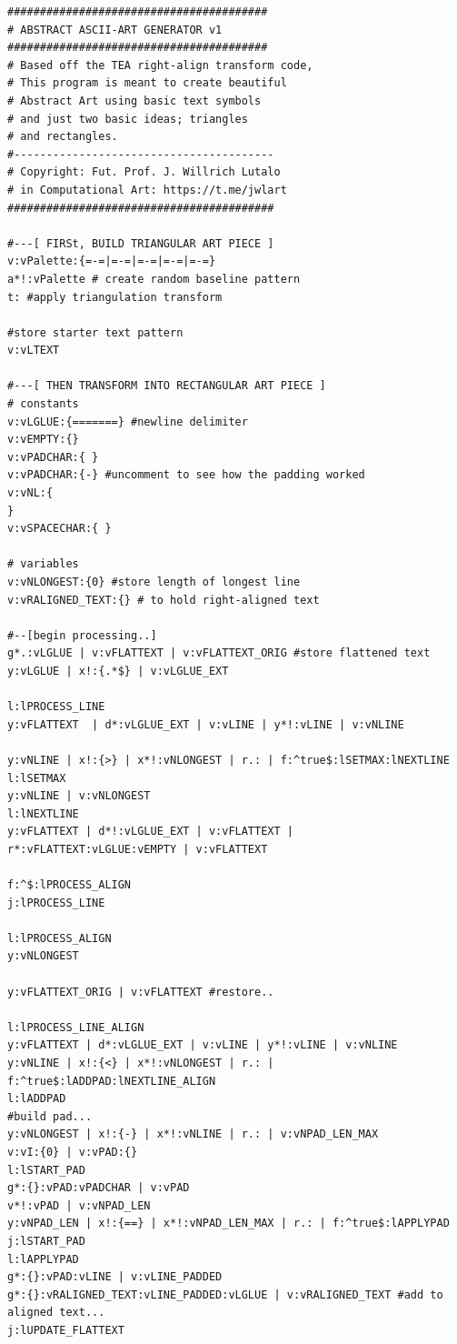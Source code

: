 \documentclass[a4paper, 18pt]{book} %
\begin{document}
{{{{
 \Large
  \begin{tcolorbox}[teaterminalstyle, title=TEA Program: ABSTRACT ASCII-ART GENERATOR v1, breakable]
  \begin{lstlisting}[language=TEA,breaklines=true,]
########################################
# ABSTRACT ASCII-ART GENERATOR v1
########################################
# Based off the TEA right-align transform code,
# This program is meant to create beautiful
# Abstract Art using basic text symbols
# and just two basic ideas; triangles 
# and rectangles. 
#----------------------------------------
# Copyright: Fut. Prof. J. Willrich Lutalo
# in Computational Art: https://t.me/jwlart
#########################################

#---[ FIRSt, BUILD TRIANGULAR ART PIECE ]
v:vPalette:{=-=|=-=|=-=|=-=|=-=}
a*!:vPalette # create random baseline pattern
t: #apply triangulation transform

#store starter text pattern
v:vLTEXT

#---[ THEN TRANSFORM INTO RECTANGULAR ART PIECE ]
# constants
v:vLGLUE:{=======} #newline delimiter
v:vEMPTY:{}
v:vPADCHAR:{ }
v:vPADCHAR:{-} #uncomment to see how the padding worked
v:vNL:{
}
v:vSPACECHAR:{ }

# variables
v:vNLONGEST:{0} #store length of longest line
v:vRALIGNED_TEXT:{} # to hold right-aligned text

#--[begin processing..]
g*.:vLGLUE | v:vFLATTEXT | v:vFLATTEXT_ORIG #store flattened text
y:vLGLUE | x!:{.*$} | v:vLGLUE_EXT

l:lPROCESS_LINE
y:vFLATTEXT  | d*:vLGLUE_EXT | v:vLINE | y*!:vLINE | v:vNLINE 

y:vNLINE | x!:{>} | x*!:vNLONGEST | r.: | f:^true$:lSETMAX:lNEXTLINE
l:lSETMAX
y:vNLINE | v:vNLONGEST
l:lNEXTLINE
y:vFLATTEXT | d*!:vLGLUE_EXT | v:vFLATTEXT | r*:vFLATTEXT:vLGLUE:vEMPTY | v:vFLATTEXT

f:^$:lPROCESS_ALIGN
j:lPROCESS_LINE

l:lPROCESS_ALIGN
y:vNLONGEST 

y:vFLATTEXT_ORIG | v:vFLATTEXT #restore..

l:lPROCESS_LINE_ALIGN
y:vFLATTEXT | d*:vLGLUE_EXT | v:vLINE | y*!:vLINE | v:vNLINE
y:vNLINE | x!:{<} | x*!:vNLONGEST | r.: | f:^true$:lADDPAD:lNEXTLINE_ALIGN
l:lADDPAD
#build pad...
y:vNLONGEST | x!:{-} | x*!:vNLINE | r.: | v:vNPAD_LEN_MAX
v:vI:{0} | v:vPAD:{}
l:lSTART_PAD
g*:{}:vPAD:vPADCHAR | v:vPAD
v*!:vPAD | v:vNPAD_LEN
y:vNPAD_LEN | x!:{==} | x*!:vNPAD_LEN_MAX | r.: | f:^true$:lAPPLYPAD
j:lSTART_PAD
l:lAPPLYPAD
g*:{}:vPAD:vLINE | v:vLINE_PADDED
g*:{}:vRALIGNED_TEXT:vLINE_PADDED:vLGLUE | v:vRALIGNED_TEXT #add to aligned text...
j:lUPDATE_FLATTEXT


\end{lstlisting}
\end{tcolorbox}}}}}
\end{document}
